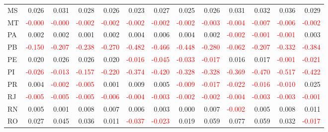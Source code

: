 \begin{table}[!htb]
{\begin{tabular}{lrrrrrrrrrrrr}
      MS & 0.026 & 0.031 & 0.028 & 0.026 & 0.023 & 0.027 & 0.025 & 0.026 & 0.031 & 0.032 & 0.036 & 0.029 \\
      MT & \textcolor{red}{-0.000} & \textcolor{red}{-0.000} & \textcolor{red}{-0.002} & \textcolor{red}{-0.002} & \textcolor{red}{-0.002} & \textcolor{red}{-0.002} & \textcolor{red}{-0.002} & \textcolor{red}{-0.003} & \textcolor{red}{-0.004} & \textcolor{red}{-0.007} & \textcolor{red}{-0.006} & \textcolor{red}{-0.002} \\
      PA & 0.002 & 0.002 & 0.001 & 0.002 & 0.004 & 0.006 & 0.004 & 0.002 & \textcolor{red}{-0.002} & \textcolor{red}{-0.001} & \textcolor{red}{-0.001} & 0.003 \\
      PB & \textcolor{red}{-0.150} & \textcolor{red}{-0.207} & \textcolor{red}{-0.238} & \textcolor{red}{-0.270} & \textcolor{red}{-0.482} & \textcolor{red}{-0.466} & \textcolor{red}{-0.448} & \textcolor{red}{-0.280} & \textcolor{red}{-0.062} & \textcolor{red}{-0.207} & \textcolor{red}{-0.332} & \textcolor{red}{-0.384} \\
      PE & 0.020 & 0.026 & 0.026 & 0.020 & \textcolor{red}{-0.016} & \textcolor{red}{-0.045} & \textcolor{red}{-0.033} & \textcolor{red}{-0.017} & 0.016 & 0.017 & \textcolor{red}{-0.001} & \textcolor{red}{-0.021} \\
      PI & \textcolor{red}{-0.026} & \textcolor{red}{-0.013} & \textcolor{red}{-0.157} & \textcolor{red}{-0.220} & \textcolor{red}{-0.374} & \textcolor{red}{-0.420} & \textcolor{red}{-0.328} & \textcolor{red}{-0.328} & \textcolor{red}{-0.369} & \textcolor{red}{-0.470} & \textcolor{red}{-0.517} & \textcolor{red}{-0.422} \\
      PR & 0.004 & \textcolor{red}{-0.002} & \textcolor{red}{-0.005} & 0.001 & 0.009 & 0.005 & \textcolor{red}{-0.009} & \textcolor{red}{-0.017} & \textcolor{red}{-0.022} & \textcolor{red}{-0.016} & \textcolor{red}{-0.010} & 0.025 \\
      RJ & \textcolor{red}{-0.005} & \textcolor{red}{-0.005} & \textcolor{red}{-0.005} & \textcolor{red}{-0.006} & \textcolor{red}{-0.004} & \textcolor{red}{-0.003} & \textcolor{red}{-0.002} & \textcolor{red}{-0.002} & \textcolor{red}{-0.004} & \textcolor{red}{-0.003} & \textcolor{red}{-0.003} & \textcolor{red}{-0.001} \\
      RN & 0.005 & 0.001 & 0.008 & 0.007 & 0.006 & 0.003 & 0.000 & 0.007 & \textcolor{red}{-0.002} & 0.005 & 0.008 & 0.011 \\
      RO & 0.027 & 0.045 & 0.036 & 0.011 & \textcolor{red}{-0.037} & \textcolor{red}{-0.023} & 0.019 & 0.059 & 0.077 & 0.059 & 0.032 & \textcolor{red}{-0.017} \\

\end{tabular}}
\end{table}
